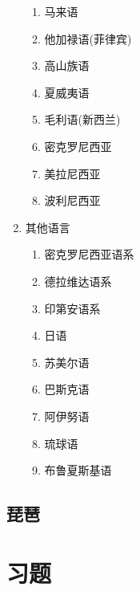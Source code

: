 \documentclass[12pt]{book}
\begin{document}
\begin{enumerate}[1.]
\begin{enumerate}[(1)]
              \item 马来语
              \item 他加禄语(菲律宾)
              \item 高山族语
              \item 夏威夷语
              \item 毛利语(新西兰)
              \item 密克罗尼西亚
              \item 美拉尼西亚
              \item 波利尼西亚
          \end{enumerate}
    \item 其他语言
          \begin{enumerate}[(1)]
              \item 密克罗尼西亚语系
              \item 德拉维达语系
              \item 印第安语系
              \item 日语
              \item 苏美尔语
              \item 巴斯克语
              \item 阿伊努语
              \item 琉球语
              \item 布鲁夏斯基语
          \end{enumerate}
\end{enumerate}




\chapter{琵琶}\label{chapter:琵琶}




















\part{习题}
\end{document}
